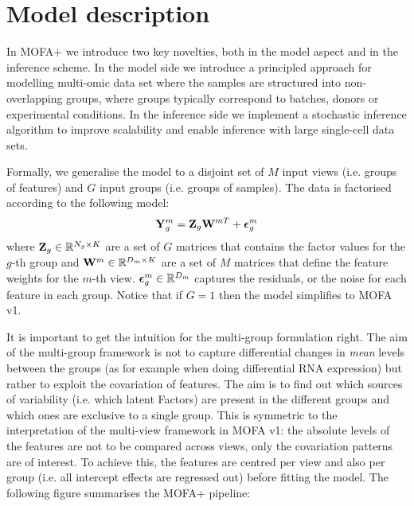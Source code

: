 \graphicspath{{Chapter4/Figs/simulations/}{Chapter4/Figs/scrna/}{Chapter4/Figs/scmet/}{Chapter4/Figs/scnmt/}}

\section{Model description}

In MOFA+ we introduce two key novelties, both in the model aspect and in the inference scheme. In the model side we introduce a principled approach for modelling multi-omic data set where the samples are structured into non-overlapping groups, where groups typically correspond to batches, donors or experimental conditions. In the inference side we implement a stochastic inference algorithm to improve scalability and enable inference with large single-cell data sets.

Formally, we generalise the model to a disjoint set of $M$ input views (i.e. groups of features) and $G$ input groups (i.e. groups of samples). The data is factorised according to the following model:
\begin{equation} \label{mofa_master_equation}
	\mathbf{Y}^{m}_{g} = \mathbf{Z}_{g} \mathbf{W}^{mT} + \mbox{\boldmath $\epsilon$}^{m}_{g}
\end{equation}
where ${\bf Z}_{g} \in \mathbb{R}^{N_{g} \times K}$ are a set of $G$ matrices that contains the factor values for the $g$-th group and ${\bf W}^{m} \in \mathbb{R}^{D_m \times K}$ are a set of $M$ matrices that define the feature weights for the $m$-th view. $\mbox{\boldmath $\epsilon$}^{m}_{g} \in \mathbb{R}^{D_m}$ captures the residuals, or the noise for each feature in each group. Notice that if $G=1$ then the model simplifies to MOFA v1. 

It is important to get the intuition for the multi-group formulation right. The aim of the multi-group framework is not to capture differential changes in \textit{mean} levels between the groups (as for example when doing differential RNA expression) but rather to exploit the covariation of features. The aim is to find out which sources of variability (i.e. which latent Factors) are present in the different groups and which ones are exclusive to a single group. This is symmetric to the interpretation of the multi-view framework in MOFA v1: the absolute levels of the features are not to be compared across views, only the covariation patterns are of interest. To achieve this, the features are centred per view and also per group (i.e. all intercept effects are regressed out) before fitting the model. The following figure summarises the MOFA+ pipeline:

